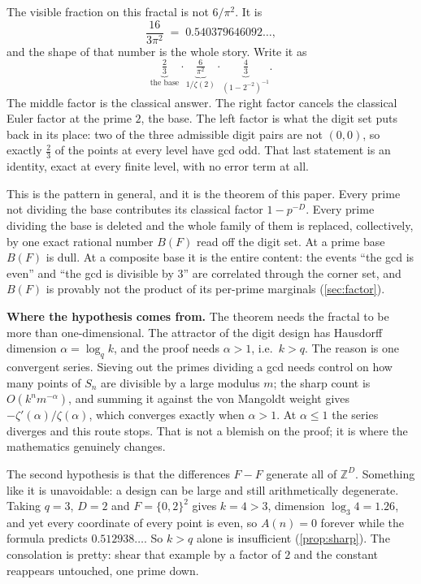 \documentclass[11pt]{amsart}
\theoremstyle{definition}
\theoremstyle{remark}
\begin{document}
The visible fraction on this fractal is not $6/\pi^2$. It is
\[
  \frac{16}{3\pi^2} \;=\; 0.540379646092\ldots,
\]
and the shape of that number is the whole story. Write it as
\[
  \underbrace{\tfrac{2}{3}}_{\text{the base}} \cdot \underbrace{\tfrac{6}{\pi^{2}}}_{1/\zeta(2)} \cdot \underbrace{\tfrac{4}{3}}_{(1-2^{-2})^{-1}} .
\]
The middle factor is the classical answer. The right factor cancels the classical Euler factor at the prime $2$, the base. The left factor is what the digit set puts back in its place: two of the three admissible digit pairs are not $(0,0)$, so exactly $\tfrac23$ of the points at every level have gcd odd. That last statement is an identity, exact at every finite level, with no error term at all.

This is the pattern in general, and it is the theorem of this paper. Every prime not dividing the base contributes its classical factor $1-p^{-D}$. Every prime dividing the base is deleted and the whole family of them is replaced, collectively, by one exact rational number $B(F)$ read off the digit set. At a prime base $B(F)$ is dull. At a composite base it is the entire content: the events ``the gcd is even'' and ``the gcd is divisible by $3$'' are correlated through the corner set, and $B(F)$ is provably not the product of its per-prime marginals (\cref{sec:factor}).

\medskip
\noindent\textbf{Where the hypothesis comes from.} The theorem needs the fractal to be more than one-dimensional. The attractor of the digit design has Hausdorff dimension $\alpha=\log_q k$, and the proof needs $\alpha>1$, i.e.\ $k>q$. The reason is one convergent series. Sieving out the primes dividing a gcd needs control on how many points of $S_n$ are divisible by a large modulus $m$; the sharp count is $O(k^n m^{-\alpha})$, and summing it against the von Mangoldt weight gives $-\zeta'(\alpha)/\zeta(\alpha)$, which converges exactly when $\alpha>1$. At $\alpha \le 1$ the series diverges and this route stops. That is not a blemish on the proof; it is where the mathematics genuinely changes.

The second hypothesis is that the differences $F-F$ generate all of $\mathbb{Z}^D$. Something like it is unavoidable: a design can be large and still arithmetically degenerate. Taking $q=3$, $D=2$ and $F=\{0,2\}^2$ gives $k=4>3$, dimension $\log_3 4 = 1.26$, and yet every coordinate of every point is even, so $A(n)=0$ forever while the formula predicts $0.512938\ldots$. So $k>q$ alone is insufficient (\cref{prop:sharp}). The consolation is pretty: shear that example by a factor of $2$ and the constant reappears untouched, one prime down.
\end{document}
